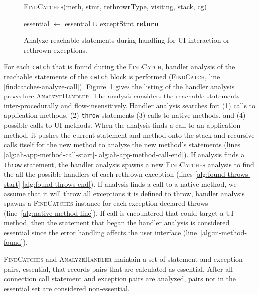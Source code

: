 \begin{figure}[t]
\begin{algorithmic}[1]
\EndFor \label{alg:calc-rethrow-types-end}

\label{alg:findcatches-rethrown-line}
\State \textsc{FindCatches}(meth, stmt, rethrownType, visiting, stack,
cg)

\label{alg:progagate-line}
\State essential $\gets$ essential $\cup$ exceptStmt
\State \textbf{return}
\EndIf
\EndFor
\label{alg:found-throws-end}
\EndIf

\EndFor

\EndProcedure
\end{algorithmic}
\caption{Analyze reachable statements during handling for UI
  interaction or rethrown exceptions.}\label{alg:analyzehandler}
\end{figure}

For each \lstinline!catch! that is found during the
\textsc{FindCatch}, handler analysis of the reachable statements of
the \lstinline!catch! block is performed (\textsc{FindCatch}, line
\ref{findcatches-analyze-call}).  Figure~\ref{alg:analyzehandler}
gives the listing of the handler analysis procedure
\textsc{AnalzyeHandler}. The analysis considers the reachable
statements inter-procedurally and flow-insensitively.  Handler
analysis searches for: (1) calls to application methods, (2)
\lstinline!throw! statements (3) calls to native methods, and (4)
possible calls to UI methods. When the analysis finds a call to an
application method, it pushes the current statement and method onto
the stack and recursive calls itself for the new method to analyze the
new method's statements (lines
\ref{alg:ah-app-method-call-start}-\ref{alg:ah-app-method-call-end}).
If analysis finds a \lstinline!throw!  statement, the handler analysis
spawns a new \textsc{FindCatches} analysis to find the all the
possible handlers of each rethrown exception (lines
\ref{alg:found-throws-start}-\ref{alg:found-throws-end}).  If analysis
finds a call to a native method, we assume that it will throw all
exceptions it is defined to throw, handler analysis spawns a
\textsc{FindCatches} instance for each exception declared throws
(line~\ref{alg:native-method-line}).  If call is encountered that
could target a UI method, then the statement that began the handler
analysis is considered essential since the error handling affects the
user interface (line~\ref{alg:ui-method-found}).

\textsc{FindCatches} and \textsc{AnalyzeHandler} maintain a set of
statement and exception pairs, essential, that records pairs that are
calculated as essential.  After all connection call statement and
exception pairs are analyzed, pairs not in the essential set are
considered non-essential.

